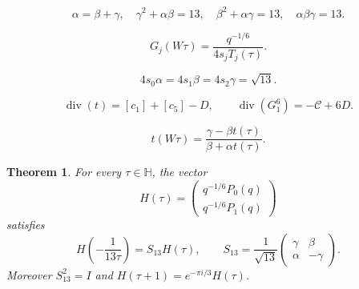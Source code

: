 \documentclass[10pt,a4paper]{amsart}
\newtheorem{theorem}{Theorem}
\newcommand{\HH}{\mathbb H}
\DeclareMathOperator{\divisor}{div}
\begin{document}
\begin{equation}\label{eq:abc}
 \alpha=\beta+\gamma,\quad \gamma^2+\alpha\beta=13,
 \quad \beta^2+\alpha\gamma=13,\quad \alpha\beta\gamma=13.
\end{equation}

\begin{equation}\label{eq:fricke-image}
 G_j(W\tau)=\frac{q^{-1/6}}{4s_jT_j(\tau)}.
\end{equation}

\begin{equation}\label{eq:gauss}
 4s_0\alpha=4s_1\beta=4s_2\gamma=\sqrt{13}.
\end{equation}

\begin{equation}\label{eq:divisors}
 \divisor(t)=[c_1]+[c_5]-D,\qquad
 \divisor(G_1^6)=-\mathcal C+6D.
\end{equation}

\begin{equation}\label{eq:projective}
 t(W\tau)=\frac{\gamma-\beta t(\tau)}{\beta+\alpha t(\tau)}.
\end{equation}

\begin{theorem}\label{thm:main}
For every $\tau\in\HH$, the vector
\[
 H(\tau)=\begin{pmatrix}q^{-1/6}P_0(q)\\q^{-1/6}P_1(q)\end{pmatrix}
\]
satisfies
\begin{equation}\label{eq:main}
 H\left(-\frac1{13\tau}\right)=S_{13}H(\tau),\qquad
 S_{13}=\frac1{\sqrt{13}}\begin{pmatrix}\gamma&\beta\\\alpha&-\gamma\end{pmatrix}.
\end{equation}
Moreover $S_{13}^2=I$ and $H(\tau+1)=e^{-\pi i/3}H(\tau)$.
\end{theorem}
\end{document}
